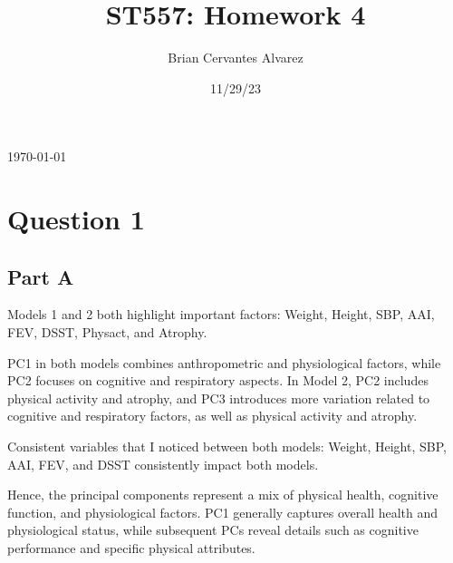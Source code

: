 \documentclass[
  letterpaper,
  DIV=11,
  numbers=noendperiod]{scrartcl}
\title{ST557: Homework 4}
\author{Brian Cervantes Alvarez}
\date{11/29/23}
\makeatletter
\newenvironment{Shaded}{}{}
\newcommand{\AttributeTok}[1]{\textcolor[rgb]{0.84,0.60,0.13}{#1}}
\newcommand{\CommentTok}[1]{\textcolor[rgb]{0.57,0.51,0.45}{#1}}
\newcommand{\DecValTok}[1]{\textcolor[rgb]{0.96,0.45,0.00}{#1}}
\newcommand{\FunctionTok}[1]{\textcolor[rgb]{0.41,0.62,0.42}{#1}}
\newcommand{\NormalTok}[1]{\textcolor[rgb]{0.24,0.22,0.21}{#1}}
\newcommand{\OtherTok}[1]{\textcolor[rgb]{0.41,0.62,0.42}{#1}}
\newcommand{\SpecialCharTok}[1]{\textcolor[rgb]{0.69,0.38,0.53}{#1}}
\newcommand{\StringTok}[1]{\textcolor[rgb]{0.60,0.59,0.10}{#1}}
\renewcommand{\maketitle}{\bgroup\setlength{\parindent}{0pt}
\begin{flushleft}
  {\sffamily\huge\textbf{\MakeUppercase{\@title}}} \vspace{0.3cm} \newline
  {\Large {\@subtitle}} \newline
  {\large\@author} \newline
  {\large\today} %
\end{flushleft}\egroup
}
\makeatother
\begin{document}
\maketitle
\pagestyle{mystyle}

\ifdefined\Shaded\renewenvironment{Shaded}{\begin{tcolorbox}[sharp corners, interior hidden, enhanced, boxrule=0pt, frame hidden, breakable, borderline west={3pt}{0pt}{shadecolor}]}{\end{tcolorbox}}\fi

\hypertarget{question-1}{%
\section{Question 1}\label{question-1}}

\hypertarget{part-a}{%
\subsection{Part A}\label{part-a}}

Models 1 and 2 both highlight important factors: Weight, Height, SBP,
AAI, FEV, DSST, Physact, and Atrophy.

PC1 in both models combines anthropometric and physiological factors,
while PC2 focuses on cognitive and respiratory aspects. In Model 2, PC2
includes physical activity and atrophy, and PC3 introduces more
variation related to cognitive and respiratory factors, as well as
physical activity and atrophy.

Consistent variables that I noticed between both models: Weight, Height,
SBP, AAI, FEV, and DSST consistently impact both models.

Hence, the principal components represent a mix of physical health,
cognitive function, and physiological factors. PC1 generally captures
overall health and physiological status, while subsequent PCs reveal
details such as cognitive performance and specific physical attributes.

\begin{Shaded}
\end{Shaded}
\end{document}
